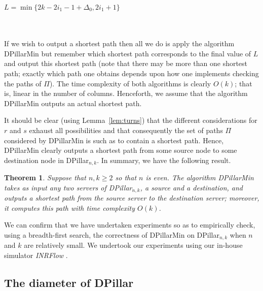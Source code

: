 \documentclass{article}
\newtheorem{theorem}[definition]{Theorem}
\begin{document}
\begin{tabbing}
\>\\
\>\\
\>\>\\
\>\>\\
\>\>\\
\>\>\>\hspace{0.2in} $L=\min\{2k-2i_1-1+\Delta_0,2i_1+1\}$\\
\>\\
\>\>\\
\end{tabbing}

If we wish to output a shortest path then all we do is apply the algorithm DPillarMin but remember which shortest path corresponds to the final value of $L$ and output this shortest path (note that there may be more than one shortest path; exactly which path one obtains depends upon how one implements checking the paths of $\Pi$). The time complexity of both algorithms is clearly $O(k)$; that is, linear in the number of columns. Henceforth, we assume that the algorithm DPillarMin outputs an actual shortest path.

It should be clear (using Lemma~\ref{lem:turns}) that the different considerations for $r$ and $s$ exhaust all possibilities and that consequently the set of paths $\Pi$ considered by DPillarMin is such as to contain a shortest path. Hence, DPillarMin clearly outputs a shortest path from some source node to some destination node in DPillar$_{n,k}$. In summary, we have the following result.

\begin{theorem}
Suppose that $n,k\geq 2$ so that $n$ is even. The algorithm DPillarMin takes as input any two servers of DPillar$_{n,k}$, a source and a destination, and outputs a shortest path from the source server to the destination server; moreover, it computes this path with time complexity $O(k)$.
\end{theorem}

We can confirm that we have undertaken experiments so as to empirically check, using a breadth-first search, the correctness of DPillarMin on DPillar$_{n,k}$ when $n$ and $k$ are relatively small. We undertook our experiments using our in-house simulator \emph{INRFlow\/} \cite{INRFlow}.

\subsection{The diameter of DPillar}
\end{document}
